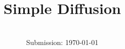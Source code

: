 


\title{Simple Diffusion}
\date{%
  \\
  Submission: \today
}



\maketitle
\thispagestyle{empty}
\tableofcontents
\newpage



\newpage

\printbibliography{}
\newpage
%

